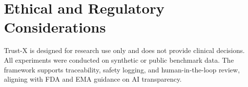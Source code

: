 \documentclass[letterpaper]{article} %
\begin{document}
\section{Ethical and Regulatory Considerations}
Trust-X is designed for research use only and does not provide clinical decisions.
All experiments were conducted on synthetic or public benchmark data.
The framework supports traceability, safety logging, and human-in-the-loop review, aligning with FDA and EMA guidance on AI transparency.

















% 
\end{document}
